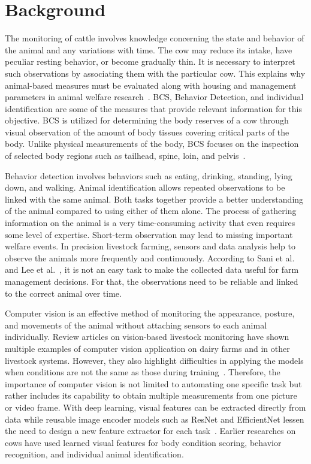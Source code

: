 \section{Background}

The monitoring of cattle involves knowledge concerning the state and behavior of the animal and any variations with time. The cow may reduce its intake, have peculiar resting behavior, or become gradually thin. It is necessary to interpret such observations by associating them with the particular cow. This explains why animal-based measures must be evaluated along with housing and management parameters in animal welfare research~\cite{weary2009understanding}. BCS, Behavior Detection, and individual identification are some of the measures that provide relevant information for this objective. BCS is utilized for determining the body reserves of a cow through visual observation of the amount of body tissues covering critical parts of the body. Unlike physical measurements of the body, BCS focuses on the inspection of selected body regions such as tailhead, spine, loin, and pelvis~\cite{edmonson1989bcs,ferguson1994bcs}.

Behavior detection involves behaviors such as eating, drinking, standing, lying down, and walking. Animal identification allows repeated observations to be linked with the same animal. Both tasks together provide a better understanding of the animal compared to using either of them alone. The process of gathering information on the animal is a very time-consuming activity that even requires some level of expertise. Short-term observation may lead to missing important welfare events. In precision livestock farming, sensors and data analysis help to observe the animals more frequently and continuously. According to Sani et al.~\cite{sani2026ab25} and Lee et al.~\cite{lee2026ab26}, it is not an easy task to make the collected data useful for farm management decisions. For that, the observations need to be reliable and linked to the correct animal over time.

Computer vision is an effective method of monitoring the appearance, posture, and movements of the animal without attaching sensors to each animal individually. Review articles on vision-based livestock monitoring have shown multiple examples of computer vision application on dairy farms and in other livestock systems. However, they also highlight difficulties in applying the models when conditions are not the same as those during training~\cite{antognoli2025ani1,zin2026ab26}. Therefore, the importance of computer vision is not limited to automating one specific task but rather includes its capability to obtain multiple measurements from one picture or video frame. With deep learning, visual features can be extracted directly from data while reusable image encoder models such as ResNet and EfficientNet lessen the need to design a new feature extractor for each task~\cite{he2016resnet,efficientnet2019}. Earlier researches on cows have used learned visual features for body condition scoring, behavior recognition, and individual animal identification.

